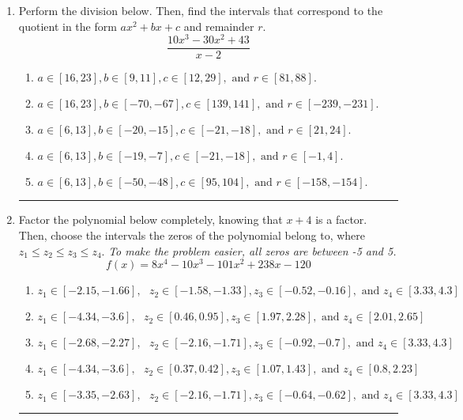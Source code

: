 \documentclass[14pt]{extbook}
\newcommand{\litem}[1]{\item#1\hspace*{-1cm}\rule{\textwidth}{0.4pt}}
\begin{document}
\begin{enumerate}
{\begin{enumerate}[label=\Alph*.]
\end{enumerate} }
\litem{
Perform the division below. Then, find the intervals that correspond to the quotient in the form $ax^2+bx+c$ and remainder $r$.\[ \frac{10x^{3} -30 x^{2} + 43}{x -2} \]\begin{enumerate}[label=\Alph*.]
\item \( a \in [16, 23], b \in [9, 11], c \in [12, 29], \text{ and } r \in [81, 88]. \)
\item \( a \in [16, 23], b \in [-70, -67], c \in [139, 141], \text{ and } r \in [-239, -231]. \)
\item \( a \in [6, 13], b \in [-20, -15], c \in [-21, -18], \text{ and } r \in [21, 24]. \)
\item \( a \in [6, 13], b \in [-19, -7], c \in [-21, -18], \text{ and } r \in [-1, 4]. \)
\item \( a \in [6, 13], b \in [-50, -48], c \in [95, 104], \text{ and } r \in [-158, -154]. \)

\end{enumerate} }
\litem{
Factor the polynomial below completely, knowing that $x + 4$ is a factor. Then, choose the intervals the zeros of the polynomial belong to, where $z_1 \leq z_2 \leq z_3 \leq z_4$. \textit{To make the problem easier, all zeros are between -5 and 5.}\[ f(x) = 8x^{4} -10 x^{3} -101 x^{2} +238 x -120 \]\begin{enumerate}[label=\Alph*.]
\item \( z_1 \in [-2.15, -1.66], \text{   }  z_2 \in [-1.58, -1.33], z_3 \in [-0.52, -0.16], \text{   and   } z_4 \in [3.33, 4.3] \)
\item \( z_1 \in [-4.34, -3.6], \text{   }  z_2 \in [0.46, 0.95], z_3 \in [1.97, 2.28], \text{   and   } z_4 \in [2.01, 2.65] \)
\item \( z_1 \in [-2.68, -2.27], \text{   }  z_2 \in [-2.16, -1.71], z_3 \in [-0.92, -0.7], \text{   and   } z_4 \in [3.33, 4.3] \)
\item \( z_1 \in [-4.34, -3.6], \text{   }  z_2 \in [0.37, 0.42], z_3 \in [1.07, 1.43], \text{   and   } z_4 \in [0.8, 2.23] \)
\item \( z_1 \in [-3.35, -2.63], \text{   }  z_2 \in [-2.16, -1.71], z_3 \in [-0.64, -0.62], \text{   and   } z_4 \in [3.33, 4.3] \)


\end{enumerate}}
\end{enumerate}
\end{document}

